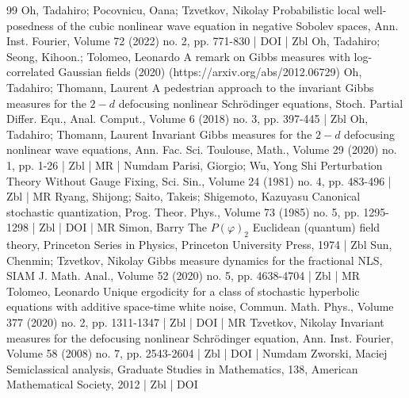 \begin{thebibliography}{99}
 Oh, Tadahiro; Pocovnicu, Oana; Tzvetkov, Nikolay Probabilistic local well-posedness of the cubic nonlinear wave equation in negative Sobolev spaces, Ann. Inst. Fourier, Volume 72 (2022) no. 2, pp. 771-830 | DOI | Zbl
 Oh, Tadahiro; Seong, Kihoon.; Tolomeo, Leonardo A remark on Gibbs measures with log-correlated Gaussian fields (2020) (https://arxiv.org/abs/2012.06729)
 Oh, Tadahiro; Thomann, Laurent A pedestrian approach to the invariant Gibbs measures for the $2-d$ defocusing nonlinear Schrödinger equations, Stoch. Partial Differ. Equ., Anal. Comput., Volume 6 (2018) no. 3, pp. 397-445 | Zbl
 Oh, Tadahiro; Thomann, Laurent Invariant Gibbs measures for the $2-d$ defocusing nonlinear wave equations, Ann. Fac. Sci. Toulouse, Math., Volume 29 (2020) no. 1, pp. 1-26 | Zbl | MR | Numdam
 Parisi, Giorgio; Wu, Yong Shi Perturbation Theory Without Gauge Fixing, Sci. Sin., Volume 24 (1981) no. 4, pp. 483-496 | Zbl | MR
 Ryang, Shijong; Saito, Takeis; Shigemoto, Kazuyasu Canonical stochastic quantization, Prog. Theor. Phys., Volume 73 (1985) no. 5, pp. 1295-1298 | Zbl | DOI | MR
 Simon, Barry The ${P}(\varphi )_{2}$ Euclidean (quantum) field theory, Princeton Series in Physics, Princeton University Press, 1974 | Zbl
 Sun, Chenmin; Tzvetkov, Nikolay Gibbs measure dynamics for the fractional NLS, SIAM J. Math. Anal., Volume 52 (2020) no. 5, pp. 4638-4704 | Zbl | MR
 Tolomeo, Leonardo Unique ergodicity for a class of stochastic hyperbolic equations with additive space-time white noise, Commun. Math. Phys., Volume 377 (2020) no. 2, pp. 1311-1347 | Zbl | DOI | MR
 Tzvetkov, Nikolay Invariant measures for the defocusing nonlinear Schrödinger equation, Ann. Inst. Fourier, Volume 58 (2008) no. 7, pp. 2543-2604 | Zbl | DOI | Numdam
 Zworski, Maciej Semiclassical analysis, Graduate Studies in Mathematics, 138, American Mathematical Society, 2012 | Zbl | DOI
\end{thebibliography}
